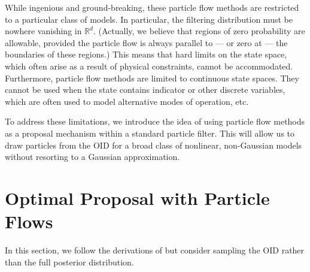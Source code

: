 \documentclass{article}
\begin{document}
While ingenious and ground-breaking, these particle flow methods are restricted to a particular class of models. In particular, the filtering distribution must be nowhere vanishing in $\mathbb{R}^d$. (Actually, we believe that regions of zero probability are allowable, provided the particle flow is always parallel to --- or zero at --- the boundaries of these regions.) This means that hard limits on the state space, which often arise as a result of physical constraints, cannot be accommodated. Furthermore, particle flow methods are limited to continuous state spaces. They cannot be used when the state contains indicator or other discrete variables, which are often used to model alternative modes of operation, etc.

To address these limitations, we introduce the idea of using particle flow methods as a proposal mechanism within a standard particle filter. This will allow us to draw particles from the OID for a broad class of nonlinear, non-Gaussian models without resorting to a Gaussian approximation.



\section{Optimal Proposal with Particle Flows}

In this section, we follow the derivations of \cite{Daum2008} but consider sampling the OID rather than the full posterior distribution.
\end{document}
